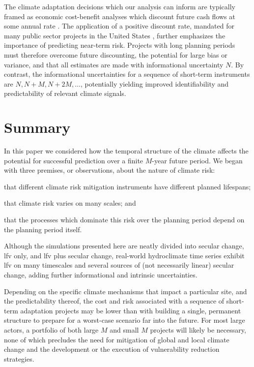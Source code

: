 \documentclass[
  draft,
  linenumbers
]{agujournal2019}
\begin{document}
The climate adaptation decisions which our analysis can inform are typically framed as economic cost-benefit analyses which discount future cash flows at some annual rate \citep{sodastrom:1999,powers:2003}.
The application of a positive discount rate, mandated for many public sector projects in the United States \citep{powers:2003}, further emphasizes the importance of predicting near-term risk.
Projects with long planning periods must therefore overcome future discounting, the potential for large bias or variance, and that all estimates are made with informational uncertainty $N$.
By contrast, the informational uncertainties for a sequence of short-term instruments are $N, N+M, N+2M, \ldots$, potentially yielding improved identifiability and predictability of relevant climate signals.

\section{Summary}

In this paper we considered how the temporal structure of the climate affects the potential for successful prediction over a finite $M$-year future period.
We began with three premises, or observations, about the nature of climate risk:
\begin{enumerate*}[label= (\roman*)]
  \item that different climate risk mitigation instruments have different planned lifespans;
  \item that climate risk varies on many scales; and
  \item that the processes which dominate this risk over the planning period depend on the planning period itself.
\end{enumerate*}
Although the simulations presented here are neatly divided into secular change, \gls{lfv} only, and \gls{lfv} plus secular change, real-world hydroclimate time series exhibit \gls{lfv} on many timescales and several sources of (not necessarily linear) secular change, adding further informational and intrinsic uncertainties.

Depending on the specific climate mechanisms that impact a particular site, and the predictability thereof, the cost and risk associated with a sequence of short-term adaptation projects may be lower than with building a single, permanent structure to prepare for a worst-case scenario far into the future.
For most large actors, a portfolio of both large $M$ and small $M$ projects will likely be necessary, none of which precludes the need for mitigation of global and local climate change and the development or the execution of vulnerability reduction strategies.
\end{document}

